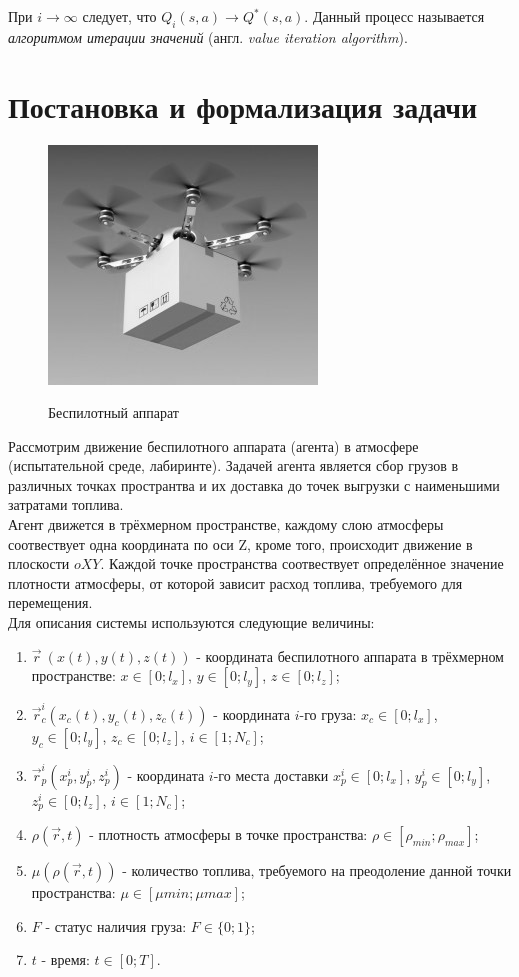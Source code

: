 \documentclass[12pt, a4paper]{report}
\theoremstyle{definition}
\theoremstyle{plain}
\theoremstyle{remark}
\theoremstyle{remark}
\theoremstyle{definition}
\begin{document}
При $i \rightarrow \infty$ следует, что $Q_{i}(s, a) \rightarrow Q^*(s, a)$. Данный процесс называется \textit{алгоритмом итерации значений} (англ. \textit{value iteration algorithm}).

\section{Постановка и формализация задачи}

\begin{figure}[h]
	{\includegraphics[scale = 0.6]{dronebw.jpg}}
	\caption{Беспилотный аппарат}
\end{figure}

Рассмотрим движение беспилотного аппарата (агента) в атмосфере (испытательной среде, лабиринте). Задачей агента является сбор грузов в различных точках пространтва и их доставка до точек выгрузки с наименьшими затратами топлива.\\

Агент движется в трёхмерном пространстве, каждому слою атмосферы соотвествует одна координата по оси Z, кроме того, происходит движение в плоскости $oXY$. Каждой точке пространства соотвествует определённое значение плотности атмосферы, от которой зависит расход топлива, требуемого для перемещения.\\

Для описания системы используются следующие величины:
\begin{enumerate}
	\item $\vec{r}\ (x(t),y(t),z(t))$ - координата беспилотного аппарата в трёхмерном пространстве: $x\in[0; l_{x}]$, $y\in[0; l_{y}]$, $z\in[0; l_{z}]$;
	\item $\vec{r}_{c}^{i}(x_{c}(t),y_{c}(t),z_{c}(t))$ - координата $i$-го груза: $x_{c}\in[0; l_{x}]$, $y_{c}\in[0; l_{y}]$, $z_{c}\in[0; l_{z}]$, $i \in [1;N_{c}]$;
	\item $\vec{r}_{p}^{i}(x_{p}^{i},y_{p}^{i},z_{p}^{i})$ - координата $i$-го места доставки $x_{p}^{i}\in[0; l_{x}]$, $y_{p}^{i}\in[0; l_{y}]$, $z_{p}^{i}\in[0; l_{z}]$, $i \in [1;N_{c}]$;	
	\item $\rho (\vec{r}, t)$ - плотность атмосферы в точке пространства:  $\rho \in[\rho_{min}; \rho_{max}]$;
	\item $\mu(\rho (\vec{r}, t))$ - количество топлива, требуемого на преодоление данной точки пространства:  $\mu \in[\mu{min}; \mu{max}]$;	
	\item $F$ - статус наличия груза: $F \in \lbrace 0; 1\rbrace$;
	\item $t$ - время: $t \in[0;T]$.
\end{enumerate}
\end{document}
